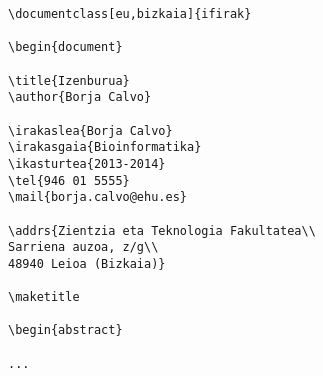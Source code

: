 \documentclass[eu]{ifirak}
\begin{document}
\begin{verbatim}
\documentclass[eu,bizkaia]{ifirak}

\begin{document}

\title{Izenburua}
\author{Borja Calvo}

\irakaslea{Borja Calvo}
\irakasgaia{Bioinformatika}
\ikasturtea{2013-2014}
\tel{946 01 5555}
\mail{borja.calvo@ehu.es}

\addrs{Zientzia eta Teknologia Fakultatea\\
Sarriena auzoa, z/g\\
48940 Leioa (Bizkaia)}

\maketitle

\begin{abstract}

...
\end{verbatim}
\end{document}
